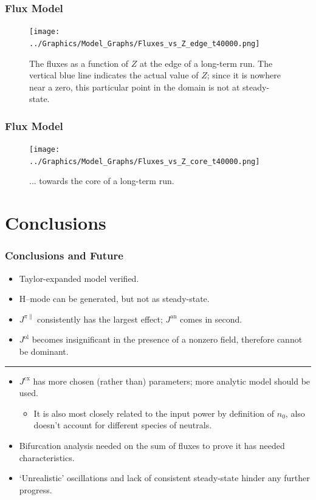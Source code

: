 \documentclass[10pt]{beamer}
\begin{document}
\begin{frame} %
\frametitle{Flux Model}

\begin{figure}[tb] %
	\centering
	\texttt{[image: ../Graphics/Model\_Graphs/Fluxes\_vs\_Z\_edge\_t40000.png]}
	\caption{The fluxes as a function of $Z$ at the edge of a long-term run.
	The vertical blue line indicates the actual value of $Z$; since it is nowhere near a zero, this particular point in the domain is not at steady-state.}
	\label{fig:fluxes_steady-state_edge_40000}
\end{figure}

\end{frame}


\begin{frame} %
\frametitle{Flux Model}

\begin{figure}[tb] %
	\centering
	\texttt{[image: ../Graphics/Model\_Graphs/Fluxes\_vs\_Z\_core\_t40000.png]}
	\caption{... towards the core of a long-term run.}
	\label{fig:fluxes_steady-state_core_40000}
\end{figure}

\end{frame}


\section{Conclusions} %
\begin{frame} %
\frametitle{Conclusions and Future}

\begin{itemize}
	\item Taylor-expanded model verified.
	\item H--mode can be generated, but not as steady-state.
	\item $J^{\pi\parallel}$ consistently has the largest effect; $J^\text{an}$ comes in second.
	\item $J^\text{ol}$ becomes insignificant in the presence of a nonzero field, therefore cannot be dominant.
\end{itemize}
\hrule
\begin{itemize}
	\item $J^\text{cx}$ has more chosen (rather than) parameters; more analytic model should be used.
	\begin{itemize}
		\item It is also most closely related to the input power by definition of $n_0$, also doesn't account for different species of neutrals.
	\end{itemize}
	\item Bifurcation analysis needed on the sum of fluxes to prove it has needed characteristics.
	\item `Unrealistic' oscillations and lack of consistent steady-state hinder any further progress.
\end{itemize}

\end{frame}
\end{document}
